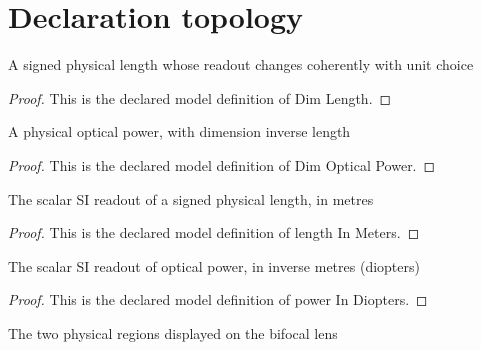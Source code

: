 \section{Declaration topology}
\begin{definition}
  \label{def:physics:phyx-mini-0029:phyxminiproblems-problemphyxmini0029-dimlength}
  A signed physical length whose readout changes coherently with unit choice
\end{definition}
\begin{proof}
  This is the declared model definition of Dim Length.
\end{proof}
\begin{definition}
  \label{def:physics:phyx-mini-0029:phyxminiproblems-problemphyxmini0029-dimopticalpower}
  A physical optical power, with dimension inverse length
\end{definition}
\begin{proof}
  This is the declared model definition of Dim Optical Power.
\end{proof}
\begin{definition}
  \label{def:physics:phyx-mini-0029:phyxminiproblems-problemphyxmini0029-lengthinmeters}
  The scalar SI readout of a signed physical length, in metres
\end{definition}
\begin{proof}
  This is the declared model definition of length In Meters.
\end{proof}
\begin{definition}
  \label{def:physics:phyx-mini-0029:phyxminiproblems-problemphyxmini0029-powerindiopters}
  The scalar SI readout of optical power, in inverse metres (diopters)
\end{definition}
\begin{proof}
  This is the declared model definition of power In Diopters.
\end{proof}
\begin{definition}
  \label{def:physics:phyx-mini-0029:phyxminiproblems-problemphyxmini0029-bifocalsegment}
  The two physical regions displayed on the bifocal lens
\end{definition}
